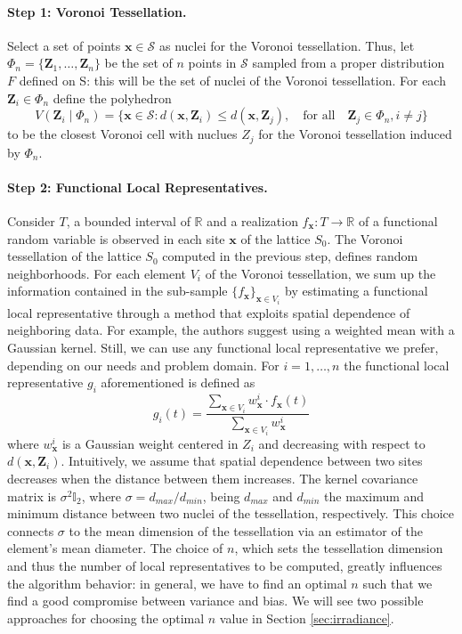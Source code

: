 \paragraph{Step 1: Voronoi Tessellation.} Select a set of points $\mathbf{x}\in\mathcal{S}$ as nuclei for the Voronoi tessellation. Thus, let $\Phi_n=\{\mathbf{Z}_1, \dots, \mathbf{Z}_n\}$ be the set of $n$ points in $\mathcal{S}$ sampled from a proper distribution $F$ defined on S: this will be the set of nuclei of the Voronoi tessellation. For each $\mathbf{Z}_i\in\Phi_n$ define the polyhedron
\begin{equation}
    \label{eq:polyedron}
    V\left(\mathbf{Z}_i \mid \Phi_n\right)=\{\mathbf{x}\in\mathcal{S} : d\left(\mathbf{x},\mathbf{Z}_i\right) \leq d\left(\mathbf{x}, \mathbf{Z}_j\right), \quad \text{for all}\quad \mathbf{Z}_j \in \Phi_n, i\neq j\}
\end{equation}
to be the closest Voronoi cell with nuclues $Z_j$ for the Voronoi tessellation induced by $\Phi_n$.
\paragraph{Step 2: Functional Local Representatives.} Consider $T$, a bounded interval of $\mathbb{R}$ and a realization $f_{\mathbf{x}}:T\rightarrow \mathbb{R}$ of a functional random variable is observed in each site $\mathbf{x}$ of the lattice $S_0$. The Voronoi tessellation of the lattice $S_0$ computed in the previous step, defines random neighborhoods. For each element $V_i$ of the Voronoi tessellation, we sum up the information contained in the sub-sample $\{f_{\mathbf{x}}\}_{\mathbf{x} \in V_i}$ by estimating a functional local representative through a method that exploits spatial dependence of neighboring data. For example, the authors suggest using a weighted mean with a Gaussian kernel. Still, we can use any functional local representative we prefer, depending on our needs and problem domain. For $i=1, \dots, n$ the functional local representative $g_i$ aforementioned is defined as
\begin{equation}
    \label{eq:gaussianmean}
    g_i(t)=\frac{\sum_{\mathbf{x}\in V_i}w^i_{\mathbf{x}}\cdot f_{\mathbf{x}}(t)}{\sum_{\mathbf{x}\in V_i}w^i_{\mathbf{x}}}
\end{equation}
where $w_{\mathbf{x}}^i$ is a Gaussian weight centered in $Z_i$ and decreasing with respect to $d\left(\mathbf{x}, \mathbf{Z}_i\right)$. Intuitively, we assume that spatial dependence between two sites decreases when the distance between them increases. The kernel covariance matrix is $\sigma^2\mathbb{I}_2$, where $\sigma=d_{max}/d_{min}$, being $d_{max}$ and $d_{min}$ the maximum and minimum distance between two nuclei of the tessellation, respectively. This choice connects $\sigma$ to the mean dimension of the tessellation via an estimator of the element's mean diameter. The choice of $n$, which sets the tessellation dimension and thus the number of local representatives to be computed, greatly influences the algorithm behavior: in general, we have to find an optimal $n$ such that we find a good compromise between variance and bias. We will see two possible approaches for choosing the optimal $n$ value in Section \ref{sec:irradiance}.
